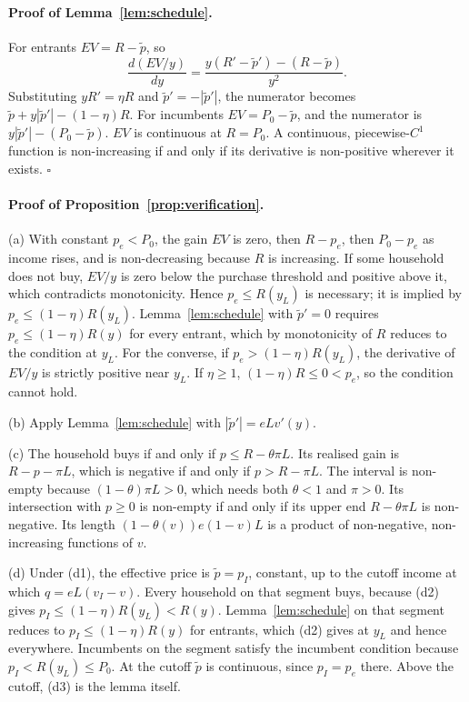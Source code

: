 \documentclass[12pt]{article}
\theoremstyle{remark}
\begin{document}
\paragraph{Proof of Lemma~\ref{lem:schedule}.} For entrants $EV=R-\tilde p$, so
\[
\frac{d(EV/y)}{dy}=\frac{y(R'-\tilde p')-(R-\tilde p)}{y^2}.
\]
Substituting $yR'=\eta R$ and $\tilde p'=-|\tilde p'|$, the numerator becomes $\tilde p+y|\tilde p'|-(1-\eta)R$. For incumbents $EV=P_0-\tilde p$, and the numerator is $y|\tilde p'|-(P_0-\tilde p)$. $EV$ is continuous at $R=P_0$. A continuous, piecewise-$C^1$ function is non-increasing if and only if its derivative is non-positive wherever it exists. $\square$

\paragraph{Proof of Proposition~\ref{prop:verification}.}
(a) With constant $p_e<P_0$, the gain $EV$ is zero, then $R-p_e$, then $P_0-p_e$ as income rises, and is non-decreasing because $R$ is increasing. If some household does not buy, $EV/y$ is zero below the purchase threshold and positive above it, which contradicts monotonicity. Hence $p_e\le R(y_L)$ is necessary; it is implied by $p_e\le(1-\eta)R(y_L)$. Lemma~\ref{lem:schedule} with $\tilde p'=0$ requires $p_e\le(1-\eta)R(y)$ for every entrant, which by monotonicity of $R$ reduces to the condition at $y_L$. For the converse, if $p_e>(1-\eta)R(y_L)$, the derivative of $EV/y$ is strictly positive near $y_L$. If $\eta\ge1$, $(1-\eta)R\le0<p_e$, so the condition cannot hold.

(b) Apply Lemma~\ref{lem:schedule} with $|\tilde p'|=eLv'(y)$.

(c) The household buys if and only if $p\le R-\theta\pi L$. Its realised gain is $R-p-\pi L$, which is negative if and only if $p>R-\pi L$. The interval is non-empty because $(1-\theta)\pi L>0$, which needs both $\theta<1$ and $\pi>0$. Its intersection with $p\ge0$ is non-empty if and only if its upper end $R-\theta\pi L$ is non-negative. Its length $(1-\theta(v))e(1-v)L$ is a product of non-negative, non-increasing functions of $v$.

(d) Under (d1), the effective price is $\tilde p=p_I$, constant, up to the cutoff income at which $q=eL(v_I-v)$. Every household on that segment buys, because (d2) gives $p_I\le(1-\eta)R(y_L)<R(y)$. Lemma~\ref{lem:schedule} on that segment reduces to $p_I\le(1-\eta)R(y)$ for entrants, which (d2) gives at $y_L$ and hence everywhere. Incumbents on the segment satisfy the incumbent condition because $p_I<R(y_L)\le P_0$. At the cutoff $\tilde p$ is continuous, since $p_I=p_e$ there. Above the cutoff, (d3) is the lemma itself.
\end{document}
